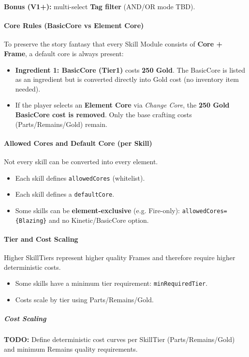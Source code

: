 \noindent
\textbf{Bonus (V1+):} multi-select \textbf{Tag filter} (AND/OR mode TBD).

\paragraph{Core Rules (BasicCore vs Element Core)}
To preserve the story fantasy that every Skill Module consists of \textbf{Core + Frame}, a default core is always present:
\begin{itemize}
	\item \textbf{Ingredient 1: BasicCore (Tier1)} costs \textbf{250 Gold}.  
	The BasicCore is listed as an ingredient but is converted directly into Gold cost (no inventory item needed).
	\item If the player selects an \textbf{Element Core} via \textit{Change Core}, the \textbf{250 Gold BasicCore cost is removed}.
	Only the base crafting costs (Parts/Remains/Gold) remain.
\end{itemize}

\paragraph{Allowed Cores and Default Core (per Skill)}
Not every skill can be converted into every element.
\begin{itemize}
	\item Each skill defines \texttt{allowedCores} (whitelist).
	\item Each skill defines a \texttt{defaultCore}.
	\item Some skills can be \textbf{element-exclusive} (e.g. Fire-only): \texttt{allowedCores=\{Blazing\}} and no Kinetic/BasicCore option.
\end{itemize}

\paragraph{Tier and Cost Scaling}
Higher SkillTiers represent higher quality Frames and therefore require higher deterministic costs.
\begin{itemize}
	\item Some skills have a minimum tier requirement: \texttt{minRequiredTier}.
	\item Costs scale by tier using Parts/Remains/Gold.
\end{itemize}

\subparagraph{Cost Scaling}
\textbf{TODO:} Define deterministic cost curves per SkillTier (Parts/Remains/Gold) and minimum Remains quality requirements.

